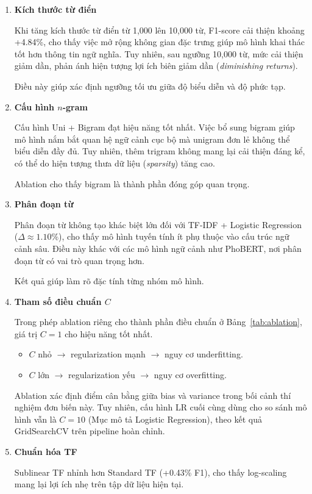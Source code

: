 \documentclass[12pt, a4paper]{report}
\newcommand{\lrBestC}{10}               %
\newcommand{\ablVocDelta}{4.84}       %
\newcommand{\ablWsDelta}{1.10}        %
\newcommand{\ablTfDelta}{0.43}        %
\begin{document}
\begin{enumerate}
    \item \textbf{Kích thước từ điển}

    Khi tăng kích thước từ điển từ 1,000 lên 10,000 từ, 
    F1-score cải thiện khoảng +\ablVocDelta\%, cho thấy việc mở rộng 
    không gian đặc trưng giúp mô hình khai thác tốt hơn thông tin ngữ nghĩa. 
    Tuy nhiên, sau ngưỡng 10,000 từ, mức cải thiện giảm dần, 
    phản ánh hiện tượng lợi ích biên giảm dần (\textit{diminishing returns}).  

    Điều này giúp xác định ngưỡng tối ưu giữa độ biểu diễn và độ phức tạp.

    \item \textbf{Cấu hình $n$-gram}

    Cấu hình Uni + Bigram đạt hiệu năng tốt nhất. 
    Việc bổ sung bigram giúp mô hình nắm bắt quan hệ ngữ cảnh cục bộ 
    mà unigram đơn lẻ không thể biểu diễn đầy đủ. 
    Tuy nhiên, thêm trigram không mang lại cải thiện đáng kể, 
    có thể do hiện tượng thưa dữ liệu (\textit{sparsity}) tăng cao.  

    Ablation cho thấy bigram là thành phần đóng góp quan trọng.

    \item \textbf{Phân đoạn từ}

    Phân đoạn từ không tạo khác biệt lớn đối với TF-IDF + Logistic Regression 
    ($\Delta \approx \ablWsDelta\%$), cho thấy mô hình tuyến tính ít phụ thuộc 
    vào cấu trúc ngữ cảnh sâu. 
    Điều này khác với các mô hình ngữ cảnh như PhoBERT, 
    nơi phân đoạn từ có vai trò quan trọng hơn.  

    Kết quả giúp làm rõ đặc tính từng nhóm mô hình.

    \item \textbf{Tham số điều chuẩn $C$}

    Trong phép ablation riêng cho thành phần điều chuẩn ở Bảng~\ref{tab:ablation}, giá trị $C = 1$ cho hiệu năng tốt nhất.

    \begin{itemize}
        \item $C$ nhỏ $\rightarrow$ regularization mạnh $\rightarrow$ nguy cơ underfitting.
        \item $C$ lớn $\rightarrow$ regularization yếu $\rightarrow$ nguy cơ overfitting.
    \end{itemize}

    Ablation xác định điểm cân bằng giữa bias và variance trong bối cảnh thí nghiệm đơn biến này. Tuy nhiên, cấu hình LR cuối cùng dùng cho so sánh mô hình vẫn là $C=\lrBestC$ (Mục mô tả Logistic Regression), theo kết quả GridSearchCV trên pipeline hoàn chỉnh.

    \item \textbf{Chuẩn hóa TF}

    Sublinear TF nhỉnh hơn Standard TF (+\ablTfDelta\% F1), 
    cho thấy log-scaling mang lại lợi ích nhẹ 
    trên tập dữ liệu hiện tại.
\end{enumerate}
\end{document}
